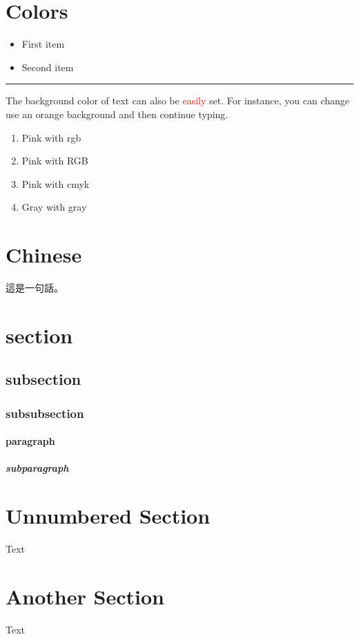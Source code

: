 \documentclass[12pt, a4paper]{article} %
\begin{document}
    \section{Colors}
        \begin{itemize}
            \color{ForestGreen}
            \item First item
            \item Second item
        \end{itemize}

        \noindent
        {\color{RubineRed} \rule{\linewidth}{0.5mm}}

        The background color of text can also be \textcolor{red}{easily} set. For
        instance, you can change use an \colorbox{BurntOrange}{orange background} and then continue typing.

        \begin{enumerate}
            \item \textcolor{mypink1}{Pink with rgb}
            \item \textcolor{mypink2}{Pink with RGB}
            \item \textcolor{mypink3}{Pink with cmyk}
            \item \textcolor{mygray}{Gray with gray}
        \end{enumerate}

    \section{Chinese}
        \begin{CJK*}{UTF8}{bkai}
            這是一句話。
        \end{CJK*}

    \section{section}
        \subsection{subsection}
            \subsubsection{subsubsection}
                \paragraph{paragraph}
                    \subparagraph{subparagraph}

    \section*{Unnumbered Section}
        Text

    \section{Another Section}
        Text

    
    
\end{document}
